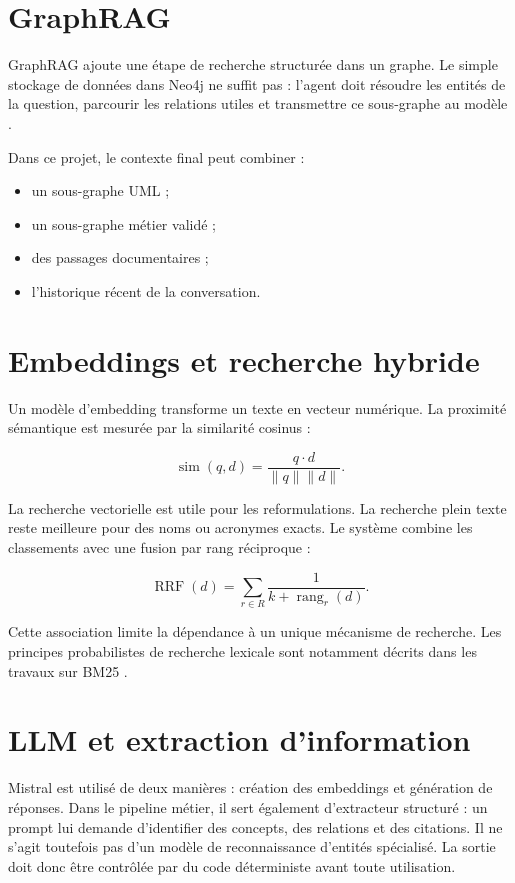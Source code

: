 \section{GraphRAG}

GraphRAG ajoute une étape de recherche structurée dans un graphe. Le simple stockage de données dans Neo4j ne suffit pas : l'agent doit résoudre les entités de la question, parcourir les relations utiles et transmettre ce sous-graphe au modèle \cite{edge2024graphrag}.

Dans ce projet, le contexte final peut combiner :

\begin{itemize}
  \item un sous-graphe UML ;
  \item un sous-graphe métier validé ;
  \item des passages documentaires ;
  \item l'historique récent de la conversation.
\end{itemize}

\section{Embeddings et recherche hybride}

Un modèle d'embedding transforme un texte en vecteur numérique. La proximité sémantique est mesurée par la similarité cosinus :

\begin{equation}
\operatorname{sim}(q,d)=\frac{q\cdot d}{\lVert q\rVert\lVert d\rVert}.
\end{equation}

La recherche vectorielle est utile pour les reformulations. La recherche plein texte reste meilleure pour des noms ou acronymes exacts. Le système combine les classements avec une fusion par rang réciproque :

\begin{equation}
\operatorname{RRF}(d)=\sum_{r\in R}\frac{1}{k+\operatorname{rang}_r(d)}.
\end{equation}

Cette association limite la dépendance à un unique mécanisme de recherche. Les principes probabilistes de recherche lexicale sont notamment décrits dans les travaux sur BM25 \cite{robertson2009bm25}.

\section{LLM et extraction d'information}

Mistral est utilisé de deux manières : création des embeddings et génération de réponses. Dans le pipeline métier, il sert également d'extracteur structuré : un prompt lui demande d'identifier des concepts, des relations et des citations. Il ne s'agit toutefois pas d'un modèle de reconnaissance d'entités spécialisé. La sortie doit donc être contrôlée par du code déterministe avant toute utilisation.

